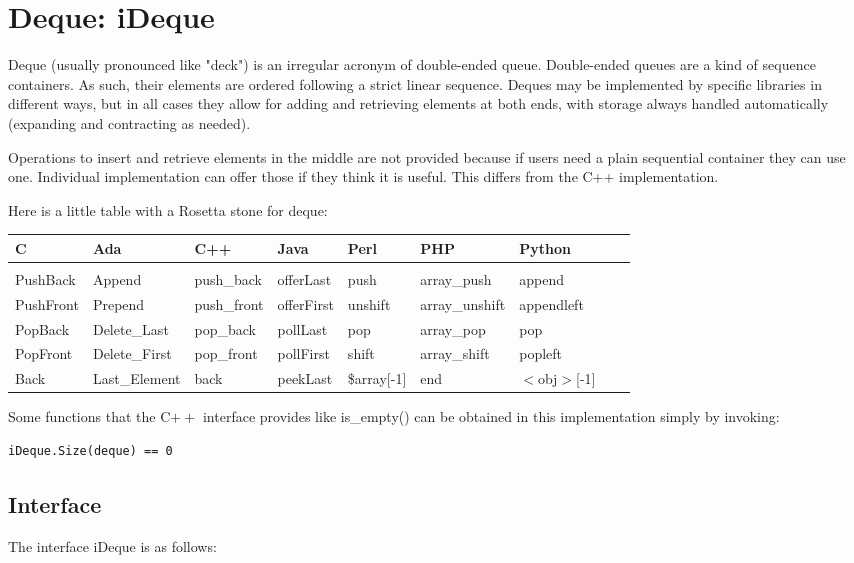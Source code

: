 \documentclass[12pt,a4paper]{memoir} %
\newcommand{\container}{}
\begin{document}
{{%
\section{Deque: iDeque}
\renewcommand{\container}{Deque}
Deque (usually pronounced like "deck") is an irregular acronym of double-ended queue. Double-ended queues are a kind of sequence containers. As such, their elements are ordered following a strict linear sequence.
Deques may be implemented by specific libraries in different ways, but in all cases they allow for adding and retrieving elements at both ends, with storage always handled automatically (expanding and contracting as needed). 

Operations to insert and retrieve elements in the middle are not provided because if users need a plain sequential container they can use one. Individual implementation can offer those if they think it is useful. This differs from the C++ implementation.

Here is a little table with a Rosetta stone for deque:
\par
\noindent
{\footnotesize
\begin{tabular} {l l l l l l l l l}
C & Ada & C++ & Java & Perl & PHP & Python 
\\
\hline
\\
PushBack & Append & push\_back & offerLast & push & array\_push & append 
\\
PushFront & Prepend & push\_front & offerFirst & unshift & array\_unshift & appendleft 
\\
PopBack & Delete\_Last & pop\_back & pollLast & pop & array\_pop & pop 
\\
PopFront & Delete\_First & pop\_front & pollFirst & shift & array\_shift & popleft 
\\
Back & Last\_Element & back & peekLast & \$array[-1] & end & $<$obj$>$[-1]  
\end{tabular}
}
\par
Some functions that the C$++$ interface provides like is\_empty() can be obtained in this implementation simply by invoking:
\begin{verbatim}
iDeque.Size(deque) == 0
\end{verbatim}
\subsection{Interface}
The interface iDeque is as follows:


}}
\end{document}
